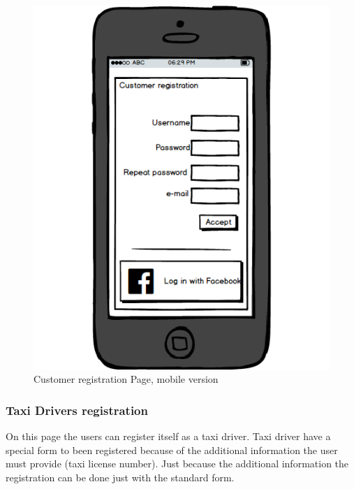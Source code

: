 \documentclass{report}
\begin{document}
				\begin{figure}[H]
					\centering
					\includegraphics[scale=0.4]{IMG/UserInterfaces/CustomerRegistration_m.png}
					\caption{Customer registration Page, mobile version}\label{cregistration_m}
				\end{figure}
			
			\subsubsection{Taxi Drivers registration}
			On this page the users can register itself as a taxi driver. Taxi driver have a special form to been registered because of the additional information the user must provide (taxi license number). Just because the additional information the registration can be done just with the standard form.
				
\end{document}
